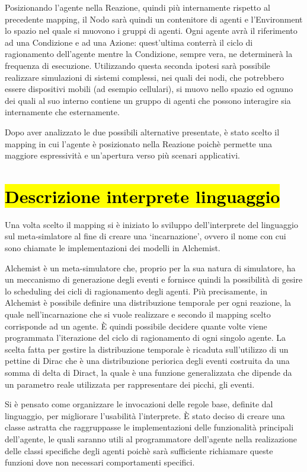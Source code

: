 Posizionando l'agente nella Reazione, quindi più internamente rispetto al precedente mapping, il Nodo sarà quindi un contenitore di agenti e l'Environment lo spazio nel quale si muovono i gruppi di agenti. Ogni agente avrà il riferimento ad una Condizione e ad una Azione: quest'ultima conterrà il ciclo di ragionamento dell'agente mentre la Condizione, sempre vera, ne determinerà la frequenza di esecuzione. Utilizzando questa seconda ipotesi sarà possibile realizzare simulazioni di sistemi complessi, nei quali dei nodi, che potrebbero essere dispositivi mobili (ad esempio cellulari), si muovo nello spazio ed ognuno dei quali al suo interno contiene un gruppo di agenti che possono interagire sia internamente che esternamente.

Dopo aver analizzato le due possibili alternative presentate, è stato scelto il mapping in cui l'agente è posizionato nella Reazione poichè permette una maggiore espressività e un'apertura verso più scenari applicativi.

\section{\hl{Descrizione interprete linguaggio}}\label{sctn:interpreteLinguaggio}
Una volta scelto il mapping si è iniziato lo sviluppo dell'interprete del linguaggio sul meta-simlatore al fine di creare una `incarnazione', ovvero il nome con cui sono chiamate le implementazioni dei modelli in Alchemist.

Alchemist è un meta-simulatore che, proprio per la sua natura di simulatore, ha un meccanismo di generazione degli eventi e fornisce quindi la possibilità di gesire lo scheduling dei cicli di ragionamento degli agenti. Più precisamente, in Alchemist è possibile definire una distribuzione temporale per ogni reazione, la quale nell'incarnazione che si vuole realizzare e secondo il mapping scelto corrisponde ad un agente. \`E quindi possibile decidere quante volte viene programmata l'iterazione del ciclo di ragionamento di ogni singolo agente. La scelta fatta per gestire la distribuzione temporale è ricaduta sull'utilizzo di un pettine di Dirac che è una distribuzione periorica degli eventi costruita da una somma di delta di Diract, la quale è una funzione generalizzata che dipende da un parametro reale utilizzata per rappresentare dei picchi, gli eventi.

Si è pensato come organizzare le invocazioni delle regole base, definite dal linguaggio, per migliorare l'usabilità l'interprete. \`E stato deciso di creare una classe astratta che raggruppasse le implementazioni delle funzionalità principali dell'agente, le quali saranno utili al programmatore dell'agente nella realizazione delle classi specifiche degli agenti poichè sarà sufficiente richiamare queste funzioni dove non necessari comportamenti specifici.

